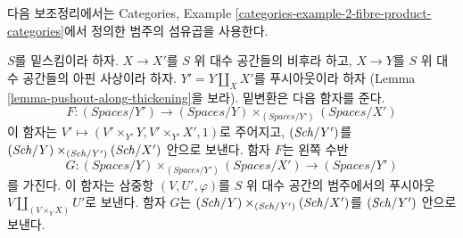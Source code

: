\noindent
다음 보조정리에서는 Categories, Example
\ref{categories-example-2-fibre-product-categories}에서 정의한
범주의 섬유곱을 사용한다.

\begin{lemma}
\label{lemma-categories-spaces-over-pushout}
$S$를 밑스킴이라 하자. $X \to X'$를 $S$ 위 대수 공간들의 비후라 하고,
$X \to Y$를 $S$ 위 대수 공간들의 아핀 사상이라 하자.
$Y' = Y \amalg_X X'$를 푸시아웃이라 하자
(Lemma \ref{lemma-pushout-along-thickening}을 보라).
밑변환은 다음 함자를 준다.
$$
F :
(\textit{Spaces}/Y')
\longrightarrow
(\textit{Spaces}/Y) \times_{(\textit{Spaces}/Y')} (\textit{Spaces}/X')
$$
이 함자는 $V' \longmapsto (V' \times_{Y'} Y, V' \times_{Y'} X', 1)$로 주어지고,
$(\mathit{Sch}/Y')$를 $(\mathit{Sch}/Y) \times_{(\mathit{Sch}/Y')} (\mathit{Sch}/X')$ 안으로 보낸다.
함자 $F$는 왼쪽 수반
$$
G :
(\textit{Spaces}/Y) \times_{(\textit{Spaces}/Y')} (\textit{Spaces}/X')
\longrightarrow
(\textit{Spaces}/Y')
$$
를 가진다. 이 함자는 삼중항 $(V, U', \varphi)$를
$S$ 위 대수 공간의 범주에서의 푸시아웃
$V \amalg_{(V \times_Y X)} U'$로 보낸다.
함자 $G$는 $(\mathit{Sch}/Y) \times_{(\mathit{Sch}/Y')} (\mathit{Sch}/X')$를
$(\mathit{Sch}/Y')$ 안으로 보낸다.
\end{lemma}

